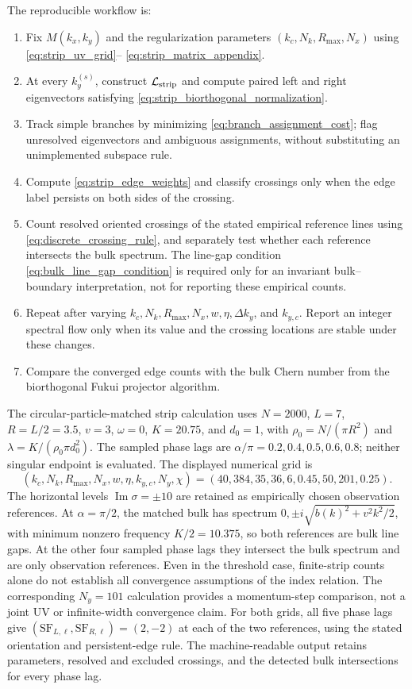\documentclass[11pt]{article}
\numberwithin{equation}{section}
\begin{document}
The reproducible workflow is:
\begin{enumerate}[label=\arabic*.]
  \item Fix $M(k_x,k_y)$ and the regularization parameters
  $(k_c,N_k,R_{\max},N_x)$ using \eqref{eq:strip_uv_grid}--
  \eqref{eq:strip_matrix_appendix}.
  \item At every $k_y^{(s)}$, construct $\mathcal L_{\rm strip}$ and compute
  paired left and right eigenvectors satisfying
  \eqref{eq:strip_biorthogonal_normalization}.
  \item Track simple branches by minimizing
  \eqref{eq:branch_assignment_cost}; flag unresolved eigenvectors and
  ambiguous assignments, without substituting an unimplemented subspace rule.
  \item Compute \eqref{eq:strip_edge_weights} and classify crossings only
  when the edge label persists on both sides of the crossing.
  \item Count resolved oriented crossings of the stated empirical reference
  lines using \eqref{eq:discrete_crossing_rule}, and separately test whether
  each reference intersects the bulk spectrum. The line-gap condition
  \eqref{eq:bulk_line_gap_condition} is required only for an invariant
  bulk--boundary interpretation, not for reporting these empirical counts.
  \item Repeat after varying $k_c,N_k,R_{\max},N_x,w,\eta,\Delta k_y$, and
  $k_{y,c}$.  Report an integer spectral flow only when its value and the
  crossing locations are stable under these changes.
  \item Compare the converged edge counts with the bulk Chern number from
  the biorthogonal Fukui projector algorithm.
\end{enumerate}
The circular-particle-matched strip calculation uses
$N=2000$, $L=7$, $R=L/2=3.5$, $v=3$, $\omega=0$, $K=20.75$, and $d_0=1$,
with $\rho_0=N/(\pi R^2)$ and $\lambda=K/(\rho_0\pi d_0^2)$.
The sampled phase lags are $\alpha/\pi=0.2,0.4,0.5,0.6,0.8$; neither
singular endpoint is evaluated. The displayed numerical grid is
\begin{equation}
  (k_c,N_k,R_{\max},N_x,w,\eta,k_{y,c},N_y,\chi)
  =(40,384,35,36,6,0.45,50,201,0.25).
  \label{eq:strip_reproduction_parameters}
\end{equation}
The horizontal levels $\operatorname{Im}\sigma=\pm10$ are retained as
empirically chosen observation references. At $\alpha=\pi/2$, the matched
bulk has spectrum $0,\pm i\sqrt{b(k)^2+v^2k^2/2}$, with minimum nonzero
frequency $K/2=10.375$, so both references are bulk line gaps.
At the other four sampled phase lags they intersect the bulk spectrum and
are only observation references. Even in the threshold case, finite-strip
counts alone do not establish all convergence assumptions of the index relation.
The corresponding $N_y=101$ calculation provides a momentum-step comparison,
not a joint UV or infinite-width convergence claim. For both grids, all five
phase lags give $(\mathrm{SF}_{L,\ell},\mathrm{SF}_{R,\ell})=(2,-2)$ at each
of the two references, using the stated orientation and persistent-edge rule.
The machine-readable
output retains parameters, resolved and excluded crossings, and the detected
bulk intersections for every phase lag.
\end{document}
